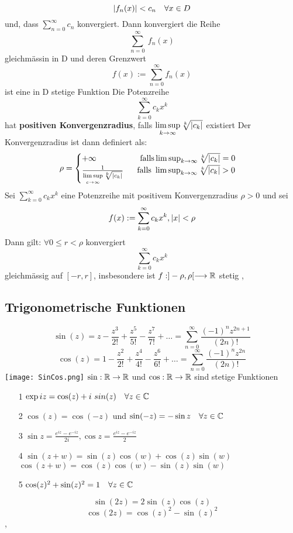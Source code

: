 \[\left\lvert f_n(x) \right\rvert < c_n \quad \forall x \in D \]
und, dass \(\sum_{n=0}^\infty c_n\) konvergiert. Dann konvergiert die Reihe
\[\sum_{n=0}^\infty\ f_n(x)\]
gleichmässin in D und deren Grenzwert
\[f(x) := \sum_{n=0}^{\infty} f_n(x)\]
ist eine in D stetige Funktion \newline
\Def[3.39] Die Potenzreihe
\[\sum_{k=0}^\infty c_kx^k\]
hat \textbf{positiven Konvergenzradius}, falls \(\limsup\limits_{k \rightarrow \infty} \sqrt[k]{\left\lvert c_k \right\rvert}\) existiert
Der Konvergenzradius ist dann definiert als:
\[\rho = \begin{cases}
    +\infty \quad \quad \quad \quad \quad \  \text{falls} \limsup_{k \rightarrow \infty} \sqrt[k]{\left\lvert c_k \right\rvert} = 0 \\
    \frac{1}{\limsup\limits_{c \rightarrow \infty} \sqrt[k]{\left|c_{k}\right|}}  \quad \  \ \text{falls } \limsup_{k \rightarrow \infty} \sqrt[k]{\left\lvert c_k \right\rvert} > 0
    \end{cases}\]
\newline
\Satz[3.40] Sei \(\sum_{k=0}^\infty c_kx^k \) eine Potenzreihe mit positivem Konvergenzradius \(\rho > 0\) und sei 
\[f(x) := \sum_{k=0}^\infty c_kx^k, \left\lvert x \right\rvert < \rho \]
Dann gilt: \(\forall 0 \leq r < \rho \) konvergiert
\[\sum_{k=0}^\infty c_kx^k \]
gleichmässig auf \([-r,r]\), insbesondere ist \newline \(f: ] -\rho,\rho [ \longrightarrow \mathbb{R}\) stetig \newline
\sep
\subsection{Trigonometrische Funktionen}
 \[ \sin(z) = z - \frac{z^3}{2!}+\frac{z^5}{5!}-\frac{z^7}{7!}+ \dots = \sum_{n=0}^{\infty} \frac{(-1)^nz^{2n+1}}{(2n)!}\]
\[ \cos(z) = 1-\frac{z^2}{2!}+\frac{z^4}{4!}-\frac{z^6}{6!}+\dots = \sum_{n=0}^{\infty} \frac{(-1)^nz^{2n}}{(2n)!}\]
\texttt{[image: SinCos.png]}
\Satz[3.41] \( \sin: \mathbb{R} \rightarrow \mathbb{R} \) und \(\cos: \mathbb{R} \rightarrow \mathbb{R} \) sind stetige Funktionen \newline
\Satz[3.42]
\begin{enumerate}
    \item [1] \( \exp iz = \cos(z) + i \ sin(z) \quad \forall z \in \mathbb{C} \)
    \item [2] \( \cos(z) = \cos(-z)\) und \newline \(\sin(-z) = -\sin z \quad \forall z \in \mathbb{C} \)
    \item [3] \( \sin z = \frac{e^{iz} - e^{-iz}}{2i}, \cos z = \frac{e^{iz} - e^{-iz}}{2}\)
    \item [4] \( \sin(z + w) = \sin(z) \cos(w) + \cos(z) \sin(w)\) \newline
    \( \cos(z + w) = \cos(z) \cos(w) - \sin(z) \sin(w) \)
    \item [5] \( \cos(z)^2 + \sin(z)^2 = 1 \quad \forall z \in \mathbb{C} \)
\end{enumerate}
\Korollar[3.34]
\[\sin(2z) = 2 \sin(z) \cos(z)\]
\[\cos(2z) = \cos(z)^2 - \sin(z)^2\]
\sep

